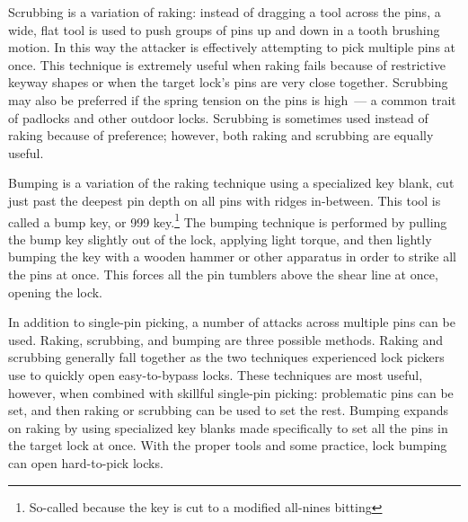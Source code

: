 \documentclass{acm_proc_article-sp}
\begin{document}
Scrubbing is a variation of raking: instead of dragging a tool across the pins, a wide, flat tool is used to push groups of pins up and down in a tooth brushing motion. In this way the attacker is effectively attempting to pick multiple pins at once. This technique is extremely useful when raking fails because of restrictive keyway shapes or when the target lock's pins are very close together. Scrubbing may also be preferred if the spring tension on the pins is high~--- a common trait of padlocks and other outdoor locks. Scrubbing is sometimes used instead of raking because of preference; however, both raking and scrubbing are equally useful.

Bumping is a variation of the raking technique using a specialized key blank, cut just past the deepest pin depth on all pins with ridges in-between. This tool is called a bump key, or 999 key.\footnote{So-called because the key is cut to a modified all-nines bitting} The bumping technique is performed by pulling the bump key slightly out of the lock, applying light torque, and then lightly bumping the key with a wooden hammer or other apparatus in order to strike all the pins at once. This forces all the pin tumblers above the shear line at once, opening the lock.

In addition to single-pin picking, a number of attacks across multiple pins can be used. Raking, scrubbing, and bumping are three possible methods. Raking and scrubbing generally fall together as the two techniques experienced lock pickers use to quickly open easy-to-bypass locks. These techniques are most useful, however, when combined with skillful single-pin picking: problematic pins can be set, and then raking or scrubbing can be used to set the rest. Bumping expands on raking by using specialized key blanks made specifically to set all the pins in the target lock at once. With the proper tools and some practice, lock bumping can open hard-to-pick locks.
\end{document}
